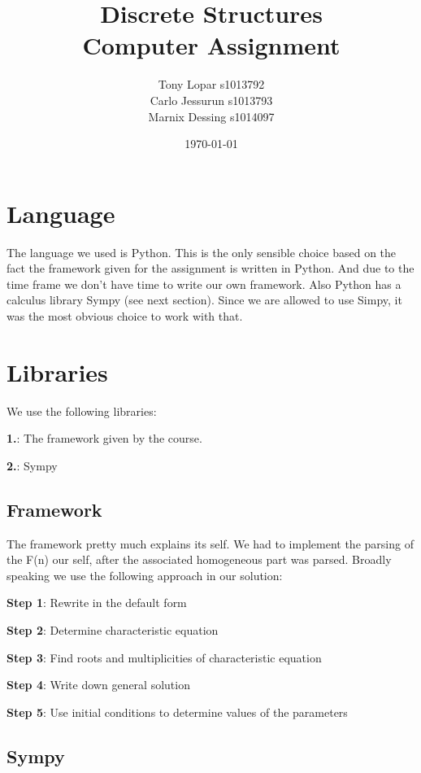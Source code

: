 \documentclass{article}
\begin{document}
\title{Discrete Structures \\ Computer Assignment}
\date{\today}
\author{Tony Lopar s1013792 \\ Carlo Jessurun s1013793 \\ Marnix Dessing s1014097}
\maketitle

\section{Language}
The language we used is Python. This is the only sensible choice based on the fact the framework given for the assignment is written in Python. And due to the time frame we don't have time to write our own framework. Also Python has a calculus library Sympy (see next section). Since we are allowed to use Simpy, it was the most obvious choice to work with that.

\section{Libraries}
We use the following libraries:

\textbf{1.}: The framework given by the course.

\textbf{2.}: Sympy

\subsection{Framework}
The framework pretty much explains its self.
We had to implement the parsing of the F(n) our self, after the associated homogeneous part was parsed. Broadly speaking we use the following approach in our solution:

\textbf{Step 1}: Rewrite in the default form

\textbf{Step 2}: Determine characteristic equation

\textbf{Step 3}: Find roots and multiplicities of characteristic equation

\textbf{Step 4}: Write down general solution

\textbf{Step 5}: Use initial conditions to determine values of the parameters

\newpage
\subsection{Sympy}
\end{document}
